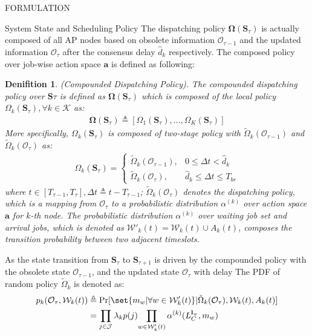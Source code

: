 \documentclass[10pt, conference, letterpaper]{IEEEtran}
\newtheorem{definition}{Denifition}
\newcommand{\define}{\triangleq}
\renewcommand{\vec}{\mathbf}
\DeclarePairedDelimiter\set\{\}
\newcommand{\apSet}{\mathcal{K}}
\newcommand{\jSet}{\mathcal{J}}
\newcommand{\wSet}{\mathcal{W}}
\newcommand{\Stat}{\mathbf{S}}
\newcommand{\Obsv}{\mathcal{O}}
\newcommand{\Policy}{\mathbf{\Omega}}
\begin{document}
\begin{section}{FORMULATION}
\begin{subsection}{System State and Scheduling Policy}
            The dispatching policy $\vec{\Omega}(\Stat_\tau)$ is actually composed of all AP nodes based on obsolete information $\Obsv_{\tau-1}$ and the updated information $\Obsv_{\tau}$ after the consensus delay $\hat{d}_k$ respectively. The composed policy over job-wise action space $\vec{a}$ is defined as following:
            \begin{definition}(Compounded Dispatching Policy).
                The compounded dispatching policy over $\Stat\tau$ is defined as $\Policy(\Stat_\tau)$ which is composed of the local policy $\Omega_k(\Stat_\tau), \forall k\in\apSet$ as:
                \begin{align}
                    \vec{\Omega}(\Stat_\tau) \triangleq [\Omega_1(\Stat_\tau), \dots, \Omega_K(\Stat_\tau)]
                \end{align}
                More specifically, $\Omega_k(\Stat_\tau)$ is composed of two-stage policy with $\tilde{\Omega}_k(\Obsv_{\tau-1})$ and $\tilde{\Omega}_k(\Obsv_{\tau})$ as:
                \begin{align}
                    \Omega_k(\Stat_\tau) = 
                    \begin{cases}
                        \tilde{\Omega}_k(\Obsv_{\tau-1}), & 0 \leq \Delta{t} < \hat{d}_k
                        \\
                        \tilde{\Omega}_k(\Obsv_{\tau}), & \hat{d}_k \leq \Delta{t} \leq T_{br}
                    \end{cases}
                \end{align}
                where $t\in[T_{\tau-1}, T_{\tau}] ,\Delta{t} \define t - T_{\tau-1}$; $\tilde{\Omega}_k(\Obsv_\tau)$ denotes the dispatching policy, which is a mapping from $\Obsv_\tau$ to a probabilistic distribution $\alpha^{(k)}$ over action space $\vec{a}$ for $k$-th node. The probabilistic distribution $\alpha^{(k)}$ over waiting job set and arrival jobs, which is denoted as $\wSet'_{k}(t)=\wSet_{k}(t) \cup A_k(t)$, composes the transition probability between two adjacent timeslots.
            \end{definition}

            As the state transition from $\Stat_{\tau}$ to $\Stat_{\tau+1}$ is driven by the compounded policy with the obsolete state $\Obsv_{\tau-1}$, and the updated state $\Obsv_{\tau}$ with delay
            The PDF of random policy $\tilde{\Omega}_k$ is denoted as:
            \begin{align}
                p_k(\Obsv_\tau, \wSet_k(t)) &\define \Pr[\set{m_w|\forall w \in \wSet'_k(t)} | \tilde{\Omega}_k(\Obsv_\tau), \wSet_k(t), A_k(t)]
                \nonumber\\
                &= {\prod_{j\in\jSet} \lambda_k p(j)} {\prod_{w\in\wSet'_k(t)} \alpha^{(k)}(L_C^{\vec{l}_w}, m_w)}
            \end{align}
        \end{subsection}


\end{section}
\end{document}
